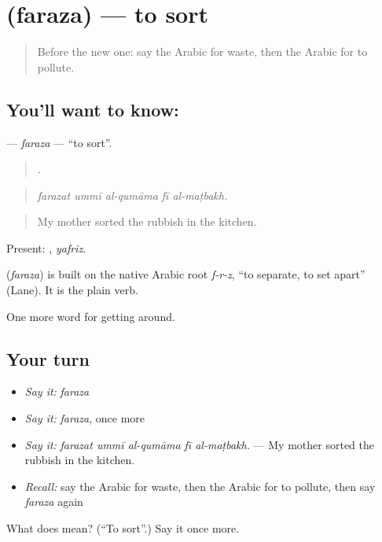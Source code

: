 \section[\texorpdfstring{\ar{فرز} (faraza)}{فرز (faraza)}]{ (faraza) — to sort}

\label{lesson:AR-C464-faraza}



\begin{quote}
Before the new one: say the Arabic for waste, then the Arabic for to pollute.
\end{quote}

\subsection*{You'll want to know: }
\textbf{} — \emph{faraza} — \textquotedblleft{}to sort\textquotedblright{}.

\begin{quote}
    .
\end{quote}

\begin{quote}
\emph{farazat ummī al-qumāma fī al-maṭbakh.}
\end{quote}

\begin{quote}
My mother sorted the rubbish in the kitchen.
\end{quote}

Present: , \emph{yafriz}.

\begin{cousinweb}
\textbf{} (\emph{faraza}) is built on the native Arabic root \emph{f-r-z}, \textquotedblleft{}to separate, to set apart\textquotedblright{} (Lane). It is the plain verb.
\end{cousinweb}

\begin{grammarlens}[title={What you've built}]
One more word for getting around.
\end{grammarlens}

\subsection*{Your turn}
\begin{itemize}
\raggedright
  \item \emph{Say it:} \emph{faraza}
  \item \emph{Say it:} \emph{faraza}, once more
  \item \emph{Say it:} \emph{farazat ummī al-qumāma fī al-maṭbakh.} — My mother sorted the rubbish in the kitchen.
  \item \emph{Recall:} say the Arabic for waste, then the Arabic for to pollute, then say \emph{faraza} again
\end{itemize}

\begin{tcolorbox}[breakable,colback=teal!4,colframe=teal!35!black,title={Before you move on}]
What does  mean? (\textquotedblleft{}To sort\textquotedblright{}.) Say it once more.
\end{tcolorbox}
